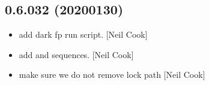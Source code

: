 \documentclass[a4paper,10pt,english]{report}
\begin{document}
\subsection{0.6.032 (2020\sphinxhyphen{}01\sphinxhyphen{}30)}
\label{\detokenize{misc/changelog:id5}}\begin{itemize}
\item {} 
 \sphinxhyphen{} add dark fp run script. {[}Neil Cook{]}

\item {} 
 \sphinxhyphen{} add  and
 sequences. {[}Neil Cook{]}

\item {} 
 \sphinxhyphen{} make sure we do not remove lock path
 {[}Neil Cook{]}

\end{itemize}
\end{document}
